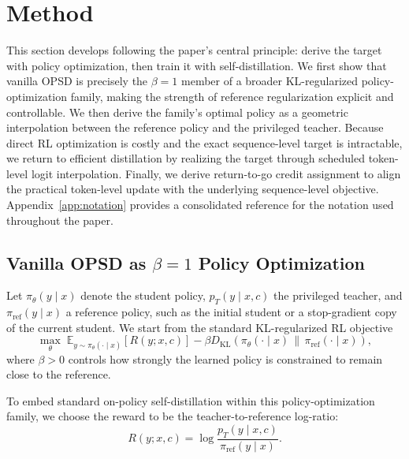 \section{Method}
\label{sec:method}

This section develops \ours{} following the paper's central principle: derive the target
with policy optimization, then train it with self-distillation. We first show that vanilla OPSD
is precisely the $\beta=1$ member of a broader KL-regularized policy-optimization family,
making the strength of reference regularization explicit and controllable. We then derive the
family's optimal policy as a geometric interpolation between the reference policy and the
privileged teacher. Because direct RL optimization is costly and the exact sequence-level
target is intractable, we return to efficient distillation by realizing the target through
scheduled token-level logit interpolation. Finally, we derive return-to-go credit assignment
to align the practical token-level update with the underlying sequence-level objective.
Appendix~\ref{app:notation} provides a consolidated reference for the notation used
throughout the paper.

\subsection{Vanilla OPSD as \texorpdfstring{$\beta=1$}{beta=1} Policy Optimization}
\label{sec:beta_opsd}

Let $\pi_\theta(y\mid x)$ denote the student policy, $p_T(y\mid x,c)$ the privileged teacher,
and $\pi_{\mathrm{ref}}(y\mid x)$ a reference policy, such as the initial student or a
stop-gradient copy of the current student. We start from the standard KL-regularized RL
objective
\begin{equation}
    \max_{\theta}
    \;
    \mathbb{E}_{y\sim\pi_\theta(\cdot\mid x)}
    \left[
    R(y;x,c)
    \right]
    -
    \beta
    D_{\mathrm{KL}}
    \left(
    \pi_\theta(\cdot\mid x)
    \,\middle\|\,
    \pi_{\mathrm{ref}}(\cdot\mid x)
    \right),
    \label{eq:kl_regularized_rl}
\end{equation}
where $\beta>0$ controls how strongly the learned policy is constrained to remain close to
the reference.

To embed standard on-policy self-distillation within this policy-optimization family, we
choose the reward to be the teacher-to-reference log-ratio:
\begin{equation}
    R(y;x,c)
    =
    \log
    \frac{
    p_T(y\mid x,c)
    }{
    \pi_{\mathrm{ref}}(y\mid x)
    }.
    \label{eq:teacher_log_ratio_reward}
\end{equation}

